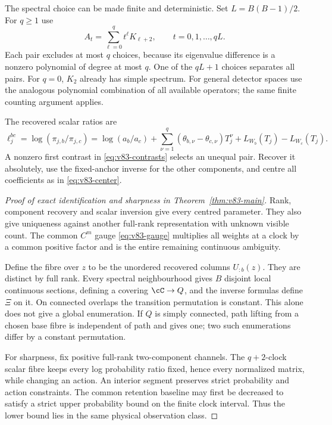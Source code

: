 The spectral choice can be made finite and deterministic. Set
$L=B(B-1)/2$. For $q\ge1$ use
\begin{equation}\label{eq:v83-finite-combinations}
 A_t=\sum_{\ell=0}^{q}t^\ell K_{\ell+2},\qquad t=0,1,\ldots,qL.
\end{equation}
Each pair excludes at most $q$ choices, because its eigenvalue difference
is a nonzero polynomial of degree at most $q$. One of the $qL+1$
choices separates all pairs. For $q=0$, $K_2$ already has simple spectrum.
For general detector spaces use the analogous polynomial combination
of all available operators; the same finite counting argument applies.

The recovered scalar ratios are
\begin{equation}\label{eq:v83-logratios}
 \ell_j^{bc}=\log(\pi_{j,b}/\pi_{j,c})
 =\log(a_b/a_c)+\sum_{\nu=1}^q
 (\theta_{b,\nu}-\theta_{c,\nu})T_j^\nu+L_{W_b}(T_j)-L_{W_c}(T_j).
\end{equation}
A nonzero first contrast in \eqref{eq:v83-contrasts} selects an unequal
pair. Recover it absolutely, use the fixed-anchor inverse for the
other components, and centre all coefficients as in
\eqref{eq:v83-center}.

\begin{proof}[Proof of exact identification and sharpness in
Theorem~\ref{thm:v83-main}]
Rank, component recovery and scalar inversion give every centred
parameter. They also give uniqueness against another full-rank
representation with unknown visible count. The common $C^m$ gauge
\eqref{eq:v83-gauge} multiplies all weights at a clock by a common
positive factor and is the entire remaining continuous ambiguity.

Define the fibre over $z$ to be the unordered recovered columns
$U_{:b}(z)$. They are distinct by full rank. Every spectral
neighbourhood gives $B$ disjoint local continuous sections, defining
a covering $\cC\to Q$, and the inverse formulas define $\Xi$ on it.
On connected overlaps the transition permutation is constant. This
alone does not give a global enumeration. If $Q$ is simply connected,
path lifting from a chosen base fibre is independent of path and
gives one; two such enumerations differ by a constant permutation.

For sharpness, fix positive full-rank two-component channels. The
$q+2$-clock scalar fibre keeps every log probability ratio fixed, hence
every normalized matrix, while changing an action. An interior segment
preserves strict probability and action constraints. The common
retention baseline may first be decreased to satisfy a strict upper
probability bound on the finite clock interval. Thus the lower bound
lies in the same physical observation class.
\end{proof}

